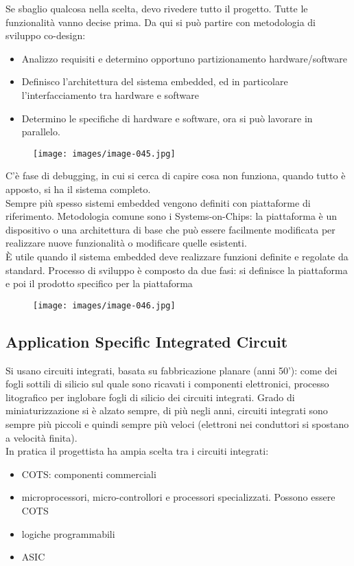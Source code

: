 \documentclass[12pt, oneside]{extbook}
\begin{document}
Se sbaglio qualcosa nella scelta, devo rivedere tutto il progetto. Tutte le funzionalità vanno decise prima. Da qui si può partire con metodologia di sviluppo co-design:
\begin{itemize}
\item Analizzo requisiti e determino opportuno partizionamento hardware/software
\item Definisco l'architettura del sistema embedded, ed in particolare l'interfacciamento tra hardware e software
\item Determino le specifiche di hardware e software, ora si può lavorare in parallelo.
\end{itemize}
\begin{figure}[!h]
\centering
\texttt{[image: images/image-045.jpg]}
\end{figure}
C'è fase di debugging, in cui si cerca di capire cosa non funziona, quando tutto è apposto, si ha il sistema completo.\\ Sempre più spesso sistemi embedded vengono definiti con piattaforme di riferimento. Metodologia comune sono i Systems-on-Chips: la piattaforma è un dispositivo o una architettura di base che può essere facilmente modificata per realizzare nuove funzionalità o modificare quelle esistenti.\\ È utile quando il sistema embedded deve realizzare funzioni definite e regolate da standard. Processo di sviluppo è composto da due fasi: si definisce la piattaforma e poi il prodotto specifico per la piattaforma\\
\begin{figure}[!h]
\centering
\texttt{[image: images/image-046.jpg]}
\end{figure}
\subsection{Application Specific Integrated Circuit}
Si usano circuiti integrati, basata su fabbricazione planare (anni 50'): come dei fogli sottili di silicio sul quale sono ricavati i componenti elettronici, processo litografico per inglobare fogli di silicio dei circuiti integrati. Grado di miniaturizzazione si è alzato sempre, di più negli anni, circuiti integrati sono sempre più piccoli e quindi sempre più veloci (elettroni nei conduttori si spostano a velocità finita).\\ In pratica il progettista ha ampia scelta tra i circuiti integrati:
\begin{itemize}
\item COTS: componenti commerciali
\item microprocessori, micro-controllori e processori specializzati. Possono essere COTS
\item logiche programmabili
\item ASIC
\end{itemize}
\end{document}
